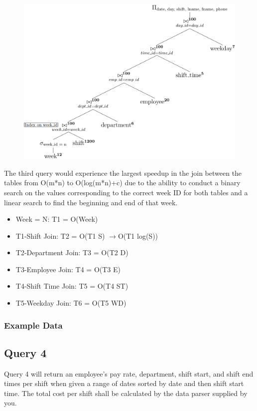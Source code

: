 \documentclass[letter,12pt]{texMemo}
\begin{document}
\begin{figure}[H]
	\centering
	\includegraphics[width=.6\textwidth]{query3_indexed.png}
\end{figure}
The third query would experience the largest speedup in the join between the tables from O(m*n) to O(log(m*n)+c) due to the ability to conduct a binary search on the values corresponding to the correct week ID for both tables and a linear search to find the beginning and end of that week.
\begin{itemize}[noitemsep,nolistsep]
	\item Week = N: T1 = O(Week)
	\item T1-Shift Join: T2 = O(T1 S) $\rightarrow$O(T1 log(S)) 
	\item T2-Department Join: T3 = O(T2 D)
	\item T3-Employee Join: T4 = O(T3 E)
	\item T4-Shift Time Join: T5 = O(T4 ST)
	\item T5-Weekday Join: T6 = O(T5 WD)
\end{itemize}

\vspace{1em}
\subsubsection*{Example Data}
\lstset{style=smallstyle}
	\begin{center}
		
	\end{center}
\lstset{style=mystyle}

\subsection*{Query 4}
Query 4 will return an employee's pay rate, department, shift start, and shift end times per shift when given a range of dates sorted by date and then shift start time. The total cost per shift shall be calculated by the data parser supplied by you.
\end{document}
